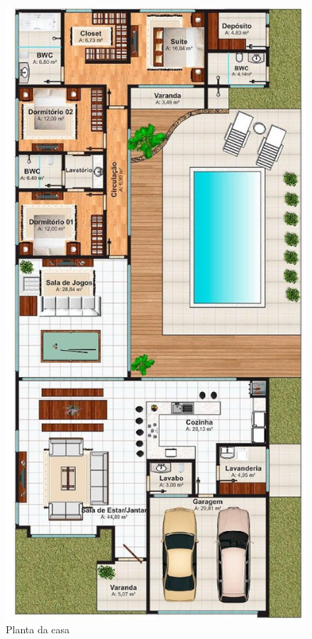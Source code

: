 \begin{figure}[H]
  \begin{center}
	\includegraphics[keepaspectratio,scale=0.3,angle=0]{figuras/planta.eps}
	\caption{Planta da casa}
  \end{center}
\end{figure}


